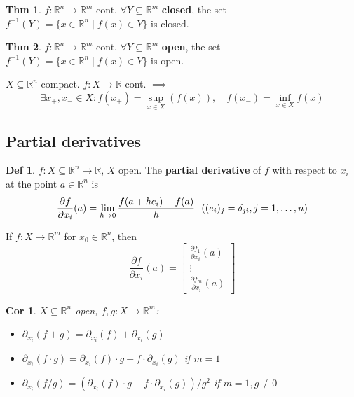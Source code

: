 \documentclass[a4paper, 10pt]{article}
\newtheorem*{corollary}{Cor}
\theoremstyle{definition}
\newtheorem*{theorem}{Thm}
\newtheorem*{definition}{Def}
\newcommand{\R}{\mathbb{R}}
\begin{document}
\begin{theorem}
    \(f: \R^n \to \R^m\) cont. \(\forall Y \subseteq \R^m\) \textbf{closed}, the set \(f^{-1}(Y) = \{x \in \R^n \mid f(x) \in Y\}\) is closed.
\end{theorem}

\begin{theorem}
    \(f: \R^n \to \R^m\) cont. \(\forall Y \subseteq \R^m\) \textbf{open}, the set \(f^{-1}(Y) = \{x \in \R^n \mid f(x) \in Y\}\) is open.
\end{theorem}

\begin{ntheorem*}
    \(X \subseteq \R^n\) compact. \(f: X \to \R\) cont. \(\implies\)
    \[\exists x_+, x_- \in X: f(x_+) = \sup_{x \in X}(f(x)), \quad f(x_-) = \inf_{x \in X} f(x)\]
\end{ntheorem*}

\subsection{Partial derivatives}
\begin{definition}
    \(f: X \subseteq \R^n \to \R\), \(X\) open. The \textbf{partial derivative} of \(f\) with respect to \(x_i\) at the point \(a \in \R^n\) is
    \[\frac{\partial f}{\partial x_i}(a) = \lim_{h \to 0} \frac{f(a + h e_i) - f(a)}{h} \hfill \ \ ((e_i)_j = \delta_{ji}, j = 1, \ldots, n)\]

    If \(f: X \to \R^m\) for \(x_0 \in \R^n\), then
    \[\frac{\partial f}{\partial x_i}(a) = \begin{bmatrix}
        \frac{\partial f_1}{\partial x_i}(a) \\
        \vdots \\
        \frac{\partial f_m}{\partial x_i}(a)
    \end{bmatrix}\]
\end{definition}

\begin{corollary}
    \(X \subseteq \R^n\) open, \(f, g: X \to \R^m\):
    \begin{itemize}
        \item \(\partial_{x_i}(f + g) = \partial_{x_i}(f) + \partial_{x_i}(g)\)
        \item \(\partial_{x_i}(f \cdot g) = \partial_{x_i}(f) \cdot g + f \cdot \partial_{x_i}(g)\) if \(m = 1\)
        \item \(\partial_{x_i}(f / g) = (\partial_{x_i}(f) \cdot g - f \cdot \partial_{x_i}(g)) / g^2\) if \(m = 1, g \not\equiv 0\)
    \end{itemize}
\end{corollary}
\end{document}
